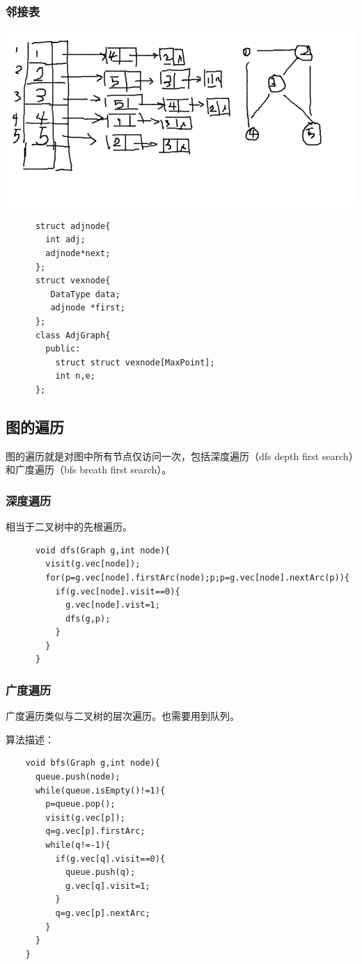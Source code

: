 \documentclass{article}
\begin{document}
		\subsubsection{邻接表}
		\includegraphics[scale=0.4]{./pic/graph-03.png}
		\begin{verbatim}
      struct adjnode{
        int adj;
        adjnode*next;
      };
      struct vexnode{
         DataType data;
         adjnode *first;
      }; 
      class AdjGraph{
        public:
          struct struct vexnode[MaxPoint];
          int n,e;
      };
		\end{verbatim}
		 
	\subsection{图的遍历}
	图的遍历就是对图中所有节点仅访问一次，包括深度遍历（dfs depth first search）和广度遍历（bfs breath first search）。
	\subsubsection{深度遍历}
		相当于二叉树中的先根遍历。

    \begin{verbatim}
      void dfs(Graph g,int node){
        visit(g.vec[node]);
        for(p=g.vec[node].firstArc(node);p;p=g.vec[node].nextArc(p)){
          if(g.vec[node].visit==0){
            g.vec[node].vist=1;
            dfs(g,p);
          }
        }
      }
	\end{verbatim}

	\subsubsection{广度遍历}
		广度遍历类似与二叉树的层次遍历。也需要用到队列。

	算法描述：
  \begin{verbatim}
    void bfs(Graph g,int node){
      queue.push(node);
      while(queue.isEmpty()!=1){
        p=queue.pop();
        visit(g.vec[p]);
        q=g.vec[p].firstArc;
        while(q!=-1){
          if(g.vec[q].visit==0){
            queue.push(q);
            g.vec[q].visit=1;
          }
		  q=g.vec[p].nextArc;
        }
      }
    }
	\end{verbatim}
\end{document}
